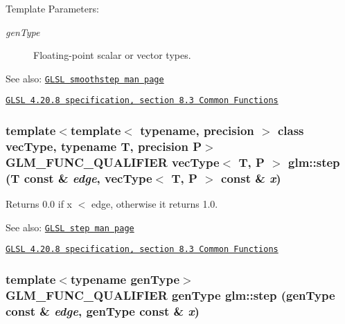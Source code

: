 \begin{Desc}
\item[Template Parameters:]
\begin{description}
\item[{\em genType}]Floating-point scalar or vector types.\end{description}
\end{Desc}
\begin{Desc}
\item[See also:]\href{http://www.opengl.org/sdk/docs/manglsl/xhtml/smoothstep.xml}{\tt GLSL smoothstep man page} 

\href{http://www.opengl.org/registry/doc/GLSLangSpec.4.20.8.pdf}{\tt GLSL 4.20.8 specification, section 8.3 Common Functions} \end{Desc}
\hypertarget{group__core__func__common_gdb27417a05ff516eda338a7047cea913}{
\subsubsection[step]{\setlength{\rightskip}{0pt plus 5cm}template$<$template$<$ typename, precision $>$ class vecType, typename T, precision P$>$ GLM\_\-FUNC\_\-QUALIFIER vecType$<$ T, P $>$ glm::step (T const \& {\em edge}, \/  vecType$<$ T, P $>$ const \& {\em x})}}
\label{group__core__func__common_gdb27417a05ff516eda338a7047cea913}


Returns 0.0 if x $<$ edge, otherwise it returns 1.0.

\begin{Desc}
\item[See also:]\href{http://www.opengl.org/sdk/docs/manglsl/xhtml/step.xml}{\tt GLSL step man page} 

\href{http://www.opengl.org/registry/doc/GLSLangSpec.4.20.8.pdf}{\tt GLSL 4.20.8 specification, section 8.3 Common Functions} \end{Desc}
\hypertarget{group__core__func__common_gcc889b24788725c04a80e29f6cc62c1e}{
\subsubsection[step]{\setlength{\rightskip}{0pt plus 5cm}template$<$typename genType$>$ GLM\_\-FUNC\_\-QUALIFIER genType glm::step (genType const \& {\em edge}, \/  genType const \& {\em x})}}
\label{group__core__func__common_gcc889b24788725c04a80e29f6cc62c1e}


